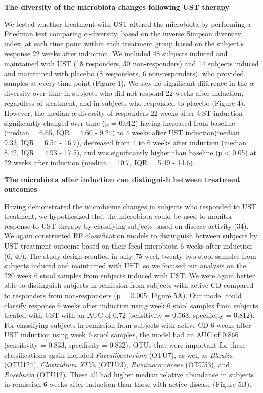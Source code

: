 \documentclass[12pt,]{article}
\begin{document}
\textbf{The diversity of the microbiota changes following UST therapy}

We tested whether treatment with UST altered the microbiota by
performing a Friedman test comparing \({\alpha}\)-diversity, based on
the inverse Simpson diversity index, at each time point within each
treatment group based on the subject's response 22 weeks after
induction. We included 48 subjects induced and maintained with UST (18
responders, 30 non-responders) and 14 subjects induced and maintained
with placebo (8 responders, 6 non-responders), who provided samples at
every time point (Figure 1). We saw no significant difference in the
\({\alpha}\)-diversity over time in subjects who did not respond 22
weeks after induction, regardless of treatment, and in subjects who
responded to placebo (Figure 4). However, the median
\({\alpha}\)-diversity of responders 22 weeks after UST induction
significantly changed over time (p = 0.012) having increased from
baseline (median = 6.65, IQR = 4.60 - 9.24) to 4 weeks after UST
induction(median = 9.33, IQR = 6.54 - 16.7), decreased from 4 to 6 weeks
after induction (median = 8.42, IQR = 4.93 - 17.5), and was
significantly higher than baseline (p \textless{} 0.05) at 22 weeks
after induction (median = 10.7, IQR = 5.49 - 14.6).

\textbf{The microbiota after induction can distinguish between treatment
outcomes}

Having demonstrated the microbiome changes in subjects who responded to
UST treatment, we hypothesized that the microbiota could be used to
monitor response to UST therapy by classifying subjects based on disease
activity (34). We again constructed RF classification models to
distinguish between subjects by UST treatment outcome based on their
fecal microbiota 6 weeks after induction (6, 40). The study design
resulted in only 75 week twenty-two stool samples from subjects induced
and maintained with UST, so we focused our analysis on the 220 week 6
stool samples from subjects induced with UST. We were again better able
to distinguish subjects in remission from subjects with active CD
compared to responders from non-responders (p = 0.005; Figure 5A). Our
model could classify response 6 weeks after induction using week 6 stool
samples from subjects treated with UST with an AUC of 0.72 (sensitivity
= 0.563, specificity = 0.812). For classifying subjects in remission
from subjects with active CD 6 weeks after UST induction using week 6
stool samples, the model had an AUC of 0.866 (sensitivity = 0.833,
specificity = 0.832). OTUs that were important for these classifications
again included \emph{Faecalibacterium} (OTU7), as well as \emph{Blautia}
(OTU124), \emph{Clostridium XIVa} (OTU73), \emph{Ruminococcaceae}
(OTU53), and \emph{Roseburia} (OTU12). These all had higher median
relative abundance in subjects in remission 6 weeks after induction than
those with active disease (Figure 5B).
\end{document}
